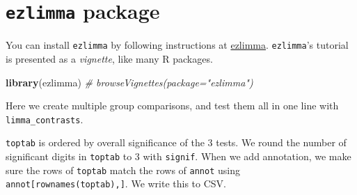 \documentclass[]{article}
\newenvironment{Shaded}{\begin{snugshade}}{\end{snugshade}}
\newcommand{\KeywordTok}[1]{\textcolor[rgb]{0.13,0.29,0.53}{\textbf{#1}}}
\newcommand{\DataTypeTok}[1]{\textcolor[rgb]{0.13,0.29,0.53}{#1}}
\newcommand{\DecValTok}[1]{\textcolor[rgb]{0.00,0.00,0.81}{#1}}
\newcommand{\StringTok}[1]{\textcolor[rgb]{0.31,0.60,0.02}{#1}}
\newcommand{\CommentTok}[1]{\textcolor[rgb]{0.56,0.35,0.01}{\textit{#1}}}
\newcommand{\ControlFlowTok}[1]{\textcolor[rgb]{0.13,0.29,0.53}{\textbf{#1}}}
\newcommand{\OperatorTok}[1]{\textcolor[rgb]{0.81,0.36,0.00}{\textbf{#1}}}
\newcommand{\NormalTok}[1]{#1}
\begin{document}
\begin{Shaded}
\end{Shaded}

\section{\texorpdfstring{\texttt{ezlimma}
package}{ezlimma package}}\label{ezlimma-package}

You can install \texttt{ezlimma} by following instructions at
\href{https://github.com/jdreyf/ezlimma}{ezlimma}. \texttt{ezlimma}'s
tutorial is presented as a \emph{vignette}, like many R packages.

\begin{Shaded}
\begin{Highlighting}[]
\KeywordTok{library}\NormalTok{(ezlimma)}
\CommentTok{# browseVignettes(package="ezlimma")}
\end{Highlighting}
\end{Shaded}

Here we create multiple group comparisons, and test them all in one line
with \texttt{limma\_contrasts}.

\begin{Shaded}
\end{Shaded}

\texttt{toptab} is ordered by overall significance of the 3 tests. We
round the number of significant digits in \texttt{toptab} to 3 with
\texttt{signif}. When we add annotation, we make sure the rows of
\texttt{toptab} match the rows of \texttt{annot} using
\texttt{annot{[}rownames(toptab),{]}}. We write this to CSV.
\end{document}

